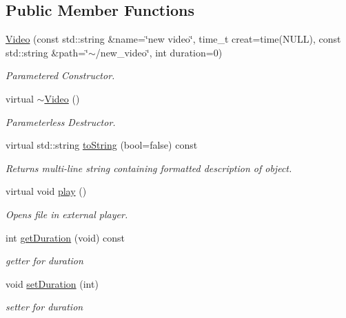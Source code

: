 \subsection*{Public Member Functions}
\begin{DoxyCompactItemize}
\item 
\hypertarget{classVideo_aa360b390158aec7378c1dceb8602138b}{\hyperlink{classVideo_aa360b390158aec7378c1dceb8602138b}{Video} (const std\-::string \&name=\char`\"{}new video\char`\"{}, time\-\_\-t creat=time(N\-U\-L\-L), const std\-::string \&path=\char`\"{}$\sim$/new\-\_\-video\char`\"{}, int duration=0)}\label{classVideo_aa360b390158aec7378c1dceb8602138b}

\begin{DoxyCompactList}\small\item\em Parametered Constructor. \end{DoxyCompactList}\item 
virtual \hyperlink{classVideo_aebf7e2a8fa2bbd79335b1cf35925d190}{$\sim$\-Video} ()
\begin{DoxyCompactList}\small\item\em Parameterless Destructor. \end{DoxyCompactList}\item 
\hypertarget{classVideo_abd241d68fe0a4e5a83d6ca5b0b070bf4}{virtual std\-::string \hyperlink{classVideo_abd241d68fe0a4e5a83d6ca5b0b070bf4}{to\-String} (bool=false) const }\label{classVideo_abd241d68fe0a4e5a83d6ca5b0b070bf4}

\begin{DoxyCompactList}\small\item\em Returns multi-\/line string containing formatted description of object. \end{DoxyCompactList}\item 
\hypertarget{classVideo_a192acb2bbb1592566ec2393dc99e3083}{virtual void \hyperlink{classVideo_a192acb2bbb1592566ec2393dc99e3083}{play} ()}\label{classVideo_a192acb2bbb1592566ec2393dc99e3083}

\begin{DoxyCompactList}\small\item\em Opens file in external player. \end{DoxyCompactList}\item 
\hypertarget{classVideo_a1a495dbb8b0389e092758c62144ebc45}{int \hyperlink{classVideo_a1a495dbb8b0389e092758c62144ebc45}{get\-Duration} (void) const }\label{classVideo_a1a495dbb8b0389e092758c62144ebc45}

\begin{DoxyCompactList}\small\item\em getter for duration \end{DoxyCompactList}\item 
\hypertarget{classVideo_a0fbbf03b902423efa2179142902bb0d0}{void \hyperlink{classVideo_a0fbbf03b902423efa2179142902bb0d0}{set\-Duration} (int)}\label{classVideo_a0fbbf03b902423efa2179142902bb0d0}

\begin{DoxyCompactList}\small\item\em setter for duration \end{DoxyCompactList}\end{DoxyCompactItemize}


